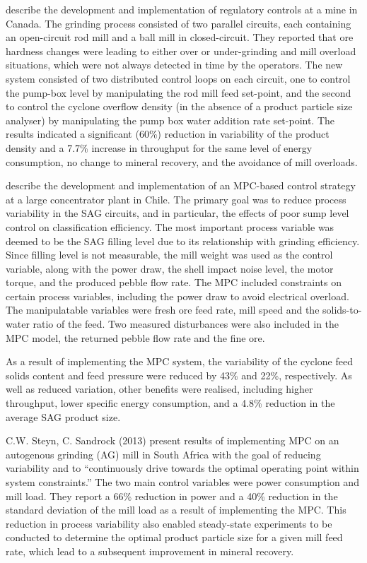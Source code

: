 \cite{nunez_self-optimizing_2009} describe the development and implementation of regulatory controls at a mine in Canada. The grinding process consisted of two parallel circuits, each containing an open-circuit rod mill and a ball mill in closed-circuit. They reported that ore hardness changes were leading to either over or under-grinding and mill overload situations, which were not always detected in time by the operators. The new system consisted of two distributed control loops on each circuit, one to control the pump-box level by manipulating the rod mill feed set-point, and the second to control the cyclone overflow density (in the absence of a product particle size analyser) by manipulating the pump box water addition rate set-point. The results indicated a significant (60\%) reduction in variability of the product density and a 7.7\% increase in throughput for the same level of energy consumption, no change to mineral recovery, and the avoidance of mill overloads.

\cite{yutronic_sag_2011} describe the development and implementation of an MPC-based control strategy at a large concentrator plant in Chile. The primary goal was to reduce process variability in the SAG circuits, and in particular, the effects of poor sump level control on classification efficiency. The most important process variable was deemed to be the SAG filling level due to its relationship with grinding efficiency. Since filling level is not measurable, the mill weight was used as the control variable, along with the power draw, the shell impact noise level, the motor torque, and the produced pebble flow rate. The MPC included constraints on certain process variables, including the power draw to avoid electrical overload. The manipulatable variables were fresh ore feed rate, mill speed and the solids-to-water ratio of the feed. Two measured disturbances were also included in the MPC model, the returned pebble flow rate and the fine ore.

As a result of implementing the MPC system, the variability of the cyclone feed solids content and feed pressure were reduced by 43\% and 22\%, respectively. As well as reduced variation, other benefits were realised, including higher throughput, lower specific energy consumption, and a 4.8\% reduction in the average SAG product size.

C.W. Steyn, C. Sandrock (2013) present results of implementing MPC on an autogenous grinding (AG) mill in South Africa with the goal of reducing variability and to ``continuously drive towards the optimal operating point within system constraints.'' The two main control variables were power consumption and mill load. They report a 66\% reduction in power and a 40\% reduction in the standard deviation of the mill load as a result of implementing the MPC. This reduction in process variability also enabled steady-state experiments to be conducted to determine the optimal product particle size for a given mill feed rate, which lead to a subsequent improvement in mineral recovery.

